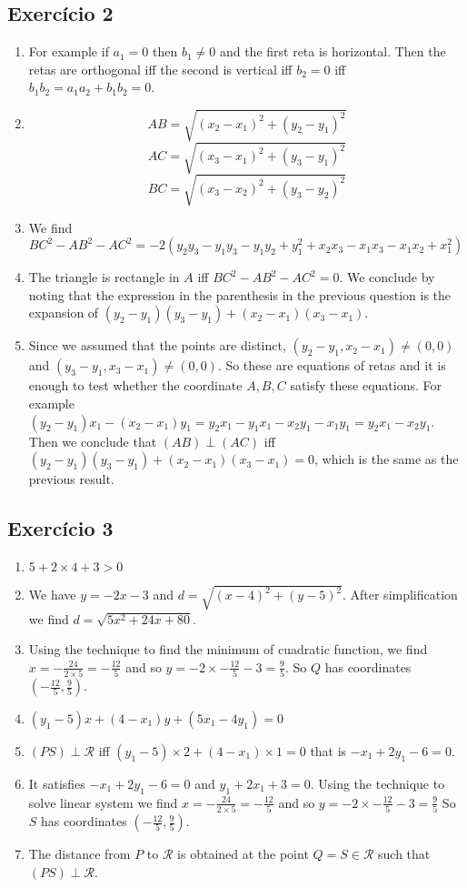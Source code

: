 \subsection*{Exercício 2}
\begin{enumerate}
\item For example if $a_1 = 0$ then $b_1\neq0$ and the first reta is horizontal.
  Then the retas are orthogonal iff the second is vertical iff
  $b_2=0$ iff $b_1b_2=a_1a_2+b_1b_2=0$.
\item
  $$AB = \sqrt{{(x_2-x_1)}^2 + {(y_2-y_1)}^2}$$
  $$AC = \sqrt{{(x_3-x_1)}^2 + {(y_3-y_1)}^2}$$
  $$BC = \sqrt{{(x_3-x_2)}^2 + {(y_3-y_2)}^2}$$
\item We find
  ${BC}^2 - {AB}^2 - {AC}^2 =
  -2\left(y_2y_3−y_1y_3−y_1y_2+y_1^2+x_2x_3−x_1x_3−x_1x_2+x_1^2\right)$
\item
  The triangle is rectangle in $A$ iff
  ${BC}^2 - {AB}^2 - {AC}^2 = 0$.
  We conclude by noting
  that the expression in the parenthesis in the previous question
  is the expansion of ${(y_2-y_1)}{(y_3-y_1)}+{(x_2-x_1)}{(x_3-x_1)}$.
\item Since we assumed that the points are distinct,
  $(y_2 - y_1, x_2 - x_1) \neq (0,0)$ and
  $(y_3 - y_1, x_3 - x_1) \neq (0,0)$. So these are equations of retas and it
  is enough to test whether the coordinate $A,B,C$ satisfy these equations.
  For example
  ${(y_2 - y_1)} x_1 - {(x_2 - x_1)} y_1 =
  y_2x_1-y_1x_1-x_2y_1-x_1y_1=y_2x_1-x_2y_1$.
  Then we conclude that $(AB) \perp (AC)$ iff
  ${(y_2-y_1)}{(y_3-y_1)}+{(x_2-x_1)}{(x_3-x_1)} = 0$, which is the same as the
  previous result.
\end{enumerate}

\subsection*{Exercício 3}

\begin{enumerate}
\item $5+2\times4+3 > 0$
\item We have $y = -2x-3$ and $d= \sqrt{{(x-4)}^2+{(y-5)}^2}$. After
  simplification we find $d =\sqrt{5x^2+24x+80}$.
\item Using the technique to find the minimum of cuadratic function,
  we find $x=-\frac{24}{2 \times 5}=-\frac{12}{5}$ and so
  $y = {-2 \times -\frac{12}{5}} - 3 = \frac{9}{5}$. So $Q$ has coordinates
  $\left(-\frac{12}{5},\frac{9}{5}\right)$.
\item ${(y_1-5)} x + {(4-x_1)}y + {(5x_1-4y_1)} = 0$
\item $(PS) \perp \mathcal R$ iff
  ${(y_1-5)} \times 2 + {(4-x_1)} \times 1 = 0$
  that is $-x_1+2y_1-6=0$.
\item It satisfies $-x_1+2y_1-6=0$ and $y_1+2x_1+3=0$.
  Using the technique to solve linear system we find
   $x=-\frac{24}{2 \times 5}=-\frac{12}{5}$ and so
  $y = {-2 \times -\frac{12}{5}} - 3 = \frac{9}{5}$ So $S$ has coordinates
  $\left(-\frac{12}{5},\frac{9}{5}\right)$.
\item The distance from $P$ to $\mathcal R$ is obtained at the
point $Q=S \in \mathcal R$ such that $(PS) \perp \mathcal R$.
\end{enumerate}

